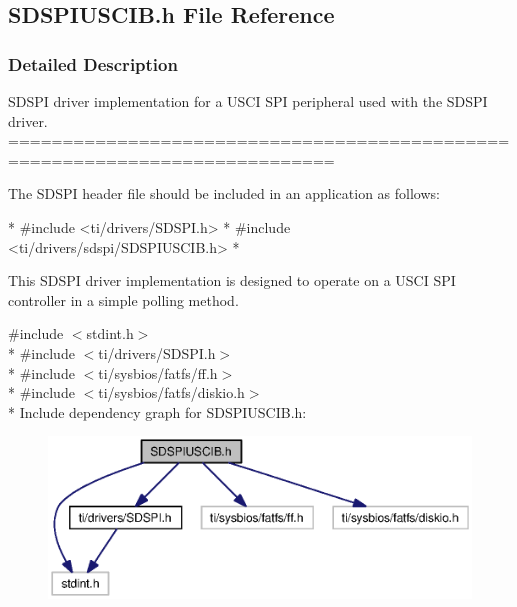 \subsection{S\-D\-S\-P\-I\-U\-S\-C\-I\-B.\-h File Reference}
\label{_s_d_s_p_i_u_s_c_i_b_8h}


\subsubsection{Detailed Description}
S\-D\-S\-P\-I driver implementation for a U\-S\-C\-I S\-P\-I peripheral used with the S\-D\-S\-P\-I driver. ============================================================================

The S\-D\-S\-P\-I header file should be included in an application as follows\-: 
\begin{DoxyCode}
*  #include <ti/drivers/SDSPI.h>
*  #include <ti/drivers/sdspi/SDSPIUSCIB.h>
*  
\end{DoxyCode}


This S\-D\-S\-P\-I driver implementation is designed to operate on a U\-S\-C\-I S\-P\-I controller in a simple polling method. 

{\ttfamily \#include $<$stdint.\-h$>$}\\*
{\ttfamily \#include $<$ti/drivers/\-S\-D\-S\-P\-I.\-h$>$}\\*
{\ttfamily \#include $<$ti/sysbios/fatfs/ff.\-h$>$}\\*
{\ttfamily \#include $<$ti/sysbios/fatfs/diskio.\-h$>$}\\*
Include dependency graph for S\-D\-S\-P\-I\-U\-S\-C\-I\-B.\-h\-:
\nopagebreak
\begin{figure}[H]
\begin{center}
\leavevmode
\includegraphics[width=350pt]{_s_d_s_p_i_u_s_c_i_b_8h__incl}
\end{center}
\end{figure}
